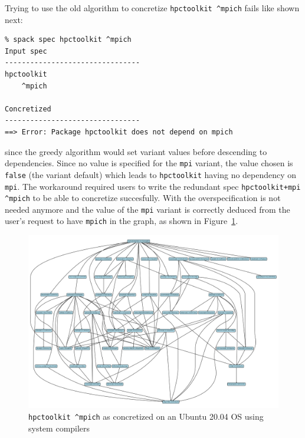 Trying to use the old algorithm to concretize \texttt{hpctoolkit \^{}mpich} fails like shown next:

\begin{verbatim}
% spack spec hpctoolkit ^mpich
Input spec
--------------------------------
hpctoolkit
    ^mpich

Concretized
--------------------------------
==> Error: Package hpctoolkit does not depend on mpich
\end{verbatim}

since the greedy algorithm would set variant values before descending to dependencies. Since no value is specified for the \texttt{mpi} variant, the value chosen is \texttt{false} (the variant default) which leads to \texttt{hpctoolkit} having no dependency on \texttt{mpi}. The workaround required users to write the redundant spec \texttt{hpctoolkit+mpi \^{}mpich} to be able to concretize succesfully. With \clingo{} the overspecification is not needed anymore and the value of the \texttt{mpi} variant is correctly deduced from the user's request to have \texttt{mpich} in the graph, as shown
in Figure~\ref{fig:hpctoolkit}.

\begin{figure}[h]
\includegraphics[width=\columnwidth]{figures/hpctoolkit_concretized.pdf}
\caption{\texttt{hpctoolkit \^{}mpich} as concretized on an Ubuntu 20.04 OS using system compilers}
\label{fig:hpctoolkit}
\end{figure}

